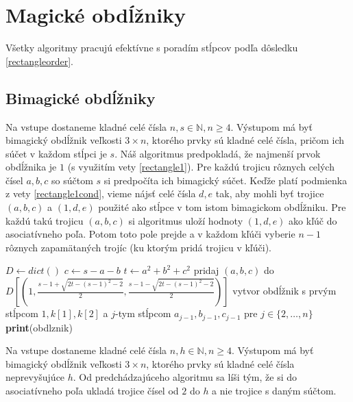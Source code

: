 \section{Magické obdĺžniky}

Všetky algoritmy pracujú efektívne s poradím stĺpcov podľa dôsledku \ref{rectangleorder}.

\subsection{Bimagické obdĺžniky}

\begin{alg}
\label{algbos}
Na vstupe dostaneme kladné celé čísla $n,s \in \mathbb{N}, n \geq 4$. Výstupom má byť bimagický obdĺžnik veľkosti $3 \times n$, ktorého prvky sú kladné celé čísla, pričom ich súčet v každom stĺpci je $s$. Náš algoritmus predpokladá, že najmenší prvok obdĺžnika je $1$ (s využitím vety \ref{rectangle1}). Pre každú trojicu rôznych celých čísel $a,b,c$ so súčtom $s$ si predpočíta ich bimagický súčet. Keďže platí podmienka z vety \ref{rectangle1cond}, vieme nájsť celé čísla $d,e$ tak, aby mohli byť trojice $(a,b,c)$ a $(1,d,e)$ použité ako stĺpce v tom istom bimagickom obdĺžniku. Pre každú takú trojicu $(a,b,c)$ si algoritmus uloží hodnoty $(1,d,e)$ ako kľúč do asociatívneho poľa. Potom toto pole prejde a v každom kľúči vyberie $n-1$ rôznych zapamätaných trojíc (ku ktorým pridá trojicu v kľúči).
\end{alg}

\begin{algorithmic}
\STATE $D \gets dict()$
		\STATE $c \gets s-a-b$
		\STATE $t \gets a^2+b^2+c^2$
			\STATE pridaj $(a,b,c)$ do $D[(1, \frac{s-1 + \sqrt{2t - (s-1)^2 - 2}}{2}, \frac{s-1 - \sqrt{2t - (s-1)^2 - 2}}{2})]$
		\ENDIF
	\ENDFOR
\ENDFOR
{}
				\STATE vytvor obdĺžnik s prvým stĺpcom $1, k[1], k[2]$ a $j$-tym stĺpcom $a_{j-1}, b_{j-1}, c_{j-1}$ pre $j \in \{2, \dots , n\}$
					\STATE \textbf{print}(obdlznik)
				\ENDIF
			\ENDFOR
		\ENDIF
	\ENDFOR
\ENDFOR
\end{algorithmic}

\begin{alg}
\label{algboh}
Na vstupe dostaneme kladné celé čísla $n,h \in \mathbb{N}, n \geq 4$. Výstupom má byť bimagický obdĺžnik veľkosti $3 \times n$, ktorého prvky sú kladné celé čísla neprevyšujúce $h$. Od predchádzajúceho algoritmu sa líši tým, že si do asociatívneho poľa ukladá trojice čísel od $2$ do $h$ a nie trojice s daným súčtom.
\end{alg}

